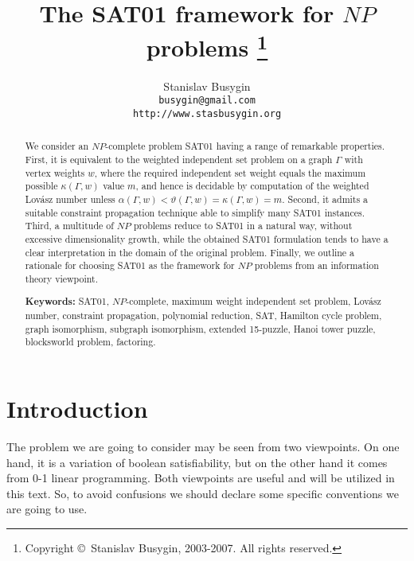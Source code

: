 \documentclass[11pt]{article}
\begin{document}
\title{The SAT01 framework for $NP$ problems
\thanks{Copyright \copyright \ Stanislav Busygin, 2003-2007. All rights reserved.}}

\author{Stanislav Busygin \\
{\tt busygin@gmail.com} \\
{\tt http://www.stasbusygin.org}}

\date{}

\maketitle

\begin{abstract}
We consider an $NP$-complete problem SAT01 having a range of remarkable properties. First, it is equivalent to the weighted independent set problem on a graph $\Gamma$ with vertex weights $w$, where the required independent set weight equals the maximum possible $\kappa(\Gamma,w)$ value $m$, and hence is decidable by computation of the weighted Lov\'asz number unless $\alpha(\Gamma,w)<\vartheta(\Gamma,w)=\kappa(\Gamma,w)=m$. Second, it admits a suitable constraint propagation technique able to simplify many SAT01 instances. Third, a multitude of $NP$ problems reduce to SAT01 in a natural way, without excessive dimensionality growth, while the obtained SAT01 formulation tends to have a clear interpretation in the domain of the original problem. Finally, we outline a rationale for choosing SAT01 as the framework for $NP$ problems from an information theory viewpoint.

{\bf Keywords:} SAT01, $NP$-complete, maximum weight independent set problem, Lov\'asz number, constraint propagation, polynomial reduction, SAT, Hamilton cycle problem, graph isomorphism, subgraph isomorphism, extended 15-puzzle, Hanoi tower puzzle, blocksworld problem, factoring.
\end{abstract}

\section{Introduction}
The problem we are going to consider may be seen from two viewpoints. On one hand, it is a variation of boolean satisfiability, but on the other hand it comes from 0-1 linear programming. Both viewpoints are useful and will be utilized in this text. So, to avoid confusions we should declare some specific conventions we are going to use.
\end{document}
